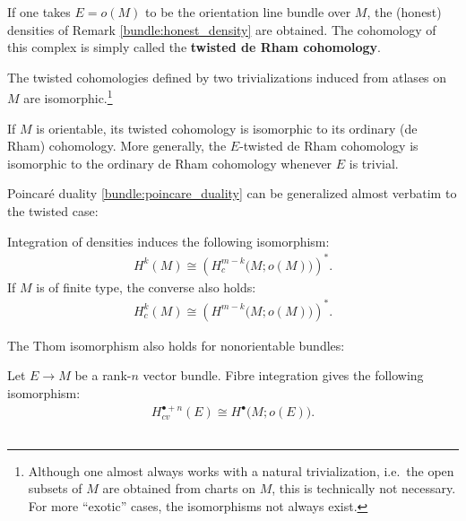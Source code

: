     If one takes $E=o(M)$ to be the orientation line bundle over $M$, the (honest) densities of Remark \ref{bundle:honest_density} are obtained. The cohomology of this complex is simply called the \textbf{twisted de Rham cohomology}.
    \begin{property}[Isomorphism]
        The twisted cohomologies defined by two trivializations induced from atlases on $M$ are isomorphic.\footnote{Although one almost always works with a natural trivialization, i.e.~the open subsets of $M$ are obtained from charts on $M$, this is technically not necessary. For more ``exotic'' cases, the isomorphisms not always exist.}
    \end{property}
    \begin{property}
        If $M$ is orientable, its twisted cohomology is isomorphic to its ordinary (de Rham) cohomology. More generally, the $E$-twisted de Rham cohomology is isomorphic to the ordinary de Rham cohomology whenever $E$ is trivial.
    \end{property}

    Poincar\'e duality \ref{bundle:poincare_duality} can be generalized almost verbatim to the twisted case:
    \begin{theorem}
        Integration of densities induces the following isomorphism:
        \begin{gather}
            H^k(M)\cong\left(H^{m-k}_c\big(M;o(M)\big)\right)^*.
        \end{gather}
        If $M$ is of finite type, the converse also holds:
        \begin{gather}
            H^k_c(M)\cong\left(H^{m-k}\big(M;o(M)\big)\right)^*.
        \end{gather}
    \end{theorem}
    The Thom isomorphism also holds for nonorientable bundles:
    \begin{theorem}
        Let $E\rightarrow M$ be a rank-$n$ vector bundle. Fibre integration gives the following isomorphism:
        \begin{gather}
            H^{\bullet+n}_{cv}(E)\cong H^\bullet\big(M;o(E)\big).
        \end{gather}
    \end{theorem}

\subsection{}

